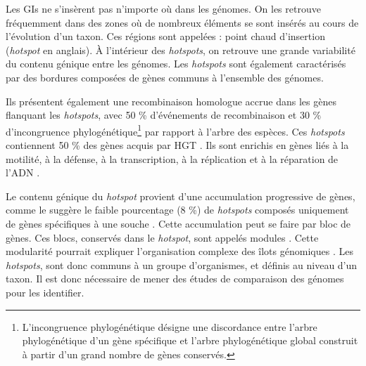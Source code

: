 Les GIs ne s'insèrent pas n'importe où dans les génomes. On les retrouve fréquemment dans des zones où de nombreux éléments se sont insérés au cours de l'évolution d'un taxon. Ces régions sont appelées : point chaud d'insertion (\textit{hotspot} en anglais).
À l'intérieur des \textit{hotspots}, on retrouve une grande variabilité du contenu génique entre les génomes. Les \textit{hotspots} sont également caractérisés par des bordures composées de gènes communs à l'ensemble des génomes. 

Ils présentent également une recombinaison homologue accrue dans les gènes flanquant les \textit{hotspots}, avec 50 \% d’événements de recombinaison et 30 \% d’incongruence phylogénétique\footnote{L'incongruence phylogénétique désigne une discordance entre l’arbre phylogénétique d’un gène spécifique et l’arbre phylogénétique global construit à partir d'un grand nombre de gènes conservés.} par rapport à l'arbre des espèces. Ces \textit{hotspots} contiennent 50 \% des gènes acquis par HGT \cite{oliveira_chromosomal_2017}. Ils sont enrichis en gènes liés à la motilité, à la défense, à la transcription, à la réplication et à la réparation de l’ADN \cite{flores_ramos_genomic_2021}.

Le contenu génique du \textit{hotspot} provient d'une accumulation progressive de gènes, comme le suggère le faible pourcentage (8 \%) de \textit{hotspots} composés uniquement de gènes spécifiques à une souche \cite{oliveira_chromosomal_2017}. Cette accumulation peut se faire par bloc de gènes. Ces blocs, conservés dans le \textit{hotspot}, sont appelés modules \cite{lescat_module_2009}. Cette modularité pourrait expliquer l'organisation complexe des îlots génomiques \cite{touchon_organised_2009}.
Les \textit{hotspots}, sont donc communs à un groupe d'organismes, et définis au niveau d'un taxon. Il est donc nécessaire de mener des études de comparaison des génomes pour les identifier.
